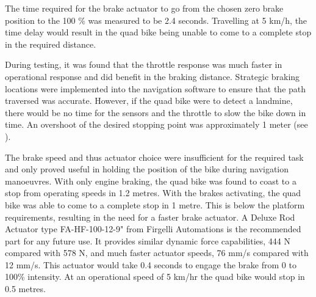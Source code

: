 \documentclass[main.tex]{subfiles}
\begin{document}
The time required for the brake actuator to go from the chosen zero brake position to the 100 \% was measured to be 2.4 seconds. Travelling at 5 km/h, the time delay would result in the quad bike being unable to come to a complete stop in the required distance.

During testing, it was found that the throttle response was much faster in operational response and did benefit in the braking distance. Strategic braking locations were implemented into the navigation software to ensure that the path traversed was accurate. However, if the quad bike were to detect a landmine, there would be no time for the sensors and the throttle to slow the bike down in time. An overshoot of the desired stopping point was approximately 1 meter (see ).

The brake speed and thus actuator choice were insufficient for the required task and only proved useful in holding the position of the bike during navigation manoeuvres. With only engine braking, the quad bike was found to coast to a stop from operating speeds in 1.2 metres. With the brakes activating, the quad bike was able to come to a complete stop in 1 metre. This is below the platform requirements, resulting in the need for a faster brake actuator. A Deluxe Rod Actuator type FA-HF-100-12-9" from Firgelli Automations is the recommended part for any future use. It provides similar dynamic force capabilities, 444 N compared with 578 N, and much faster actuator speeds, 76 mm/s compared with 12 mm/s. This actuator would take 0.4 seconds to engage the brake from 0 to 100\% intensity. At an operational speed of 5 km/hr the quad bike would stop in 0.5 metres.
\end{document}
